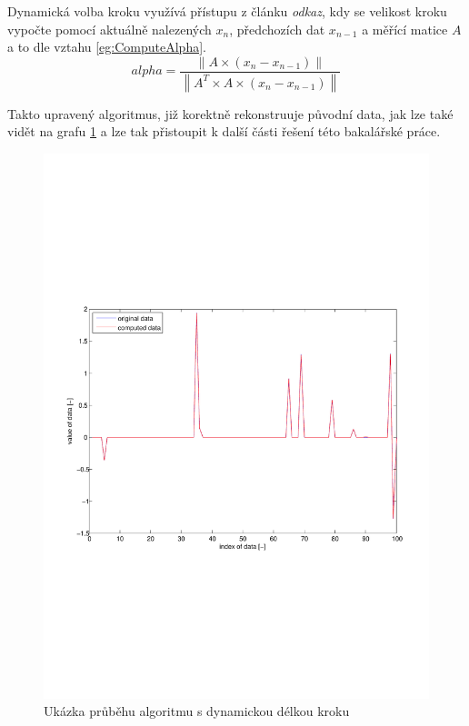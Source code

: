 \documentclass[FM,BP]{tulthesis}
\newcounter{Vzorce}
\begin{document}
Dynamická volba kroku využívá přístupu z článku \textit{odkaz}, kdy se velikost kroku vypočte pomocí aktuálně nalezených $x_{n}$, předchozích dat $x_{n-1}$ a měřící matice $A$ a to dle vztahu \ref{eg:ComputeAlpha}.
\begin{equation} \label{eg:ComputeAlpha}  \tag{Vzorec \theVzorce}
alpha = \frac{\left\| A \times (x_{n} - x_{n-1}) \right\|}{\left\| A^{T} \times A \times (x_{n} - x_{n-1}) \right\| }
\end{equation}

Takto upravený algoritmus, již korektně rekonstruuje původní data, jak lze také vidět na grafu \ref{fig:dynamicAlpha} a lze tak přistoupit k další části řešení této bakalářské práce.
\begin{figure}[!ht]
\begin{center}
\includegraphics[scale=0.5]{obr/dynamic.pdf}
\end{center}
\caption{Ukázka průběhu algoritmu s dynamickou délkou kroku}
\label{fig:dynamicAlpha}
\end{figure}
\end{document}
